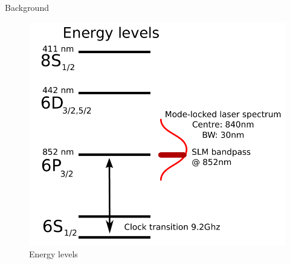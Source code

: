\begin{block}{Background}
  \begin{figure}
    \begin{center}
      \includegraphics[width=.3\textwidth]{figures/energylevels}
      \caption{Energy levels}
    \end{center}
  \end{figure}
\end{block}
